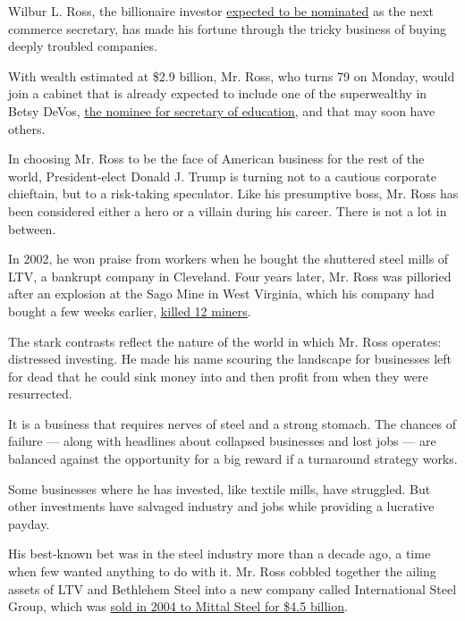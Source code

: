 Wilbur L. Ross, the billionaire investor
\href{http://www.nytimes3xbfgragh.onion/2016/11/24/us/politics/wilbur-ross-commerce-trump.html}{expected
to be nominated} as the next commerce secretary, has made his fortune
through the tricky business of buying deeply troubled companies.

With wealth estimated at \$2.9 billion, Mr. Ross, who turns 79 on
Monday, would join a cabinet that is already expected to include one of
the superwealthy in Betsy DeVos,
\href{http://www.nytimes3xbfgragh.onion/2016/11/23/us/politics/betsy-devos-trumps-education-pick-has-steered-money-from-public-schools.html}{the
nominee for secretary of education}, and that may soon have others.

In choosing Mr. Ross to be the face of American business for the rest of
the world, President-elect Donald J. Trump is turning not to a cautious
corporate chieftain, but to a risk-taking speculator. Like his
presumptive boss, Mr. Ross has been considered either a hero or a
villain during his career. There is not a lot in between.

In 2002, he won praise from workers when he bought the shuttered steel
mills of LTV, a bankrupt company in Cleveland. Four years later, Mr.
Ross was pilloried after an explosion at the Sago Mine in West Virginia,
which his company had bought a few weeks earlier,
\href{http://www.nytimes3xbfgragh.onion/2006/05/03/us/03mine.html}{killed
12 miners}.

The stark contrasts reflect the nature of the world in which Mr. Ross
operates: distressed investing. He made his name scouring the landscape
for businesses left for dead that he could sink money into and then
profit from when they were resurrected.

It is a business that requires nerves of steel and a strong stomach. The
chances of failure --- along with headlines about collapsed businesses
and lost jobs --- are balanced against the opportunity for a big reward
if a turnaround strategy works.

Some businesses where he has invested, like textile mills, have
struggled. But other investments have salvaged industry and jobs while
providing a lucrative payday.

His best-known bet was in the steel industry more than a decade ago, a
time when few wanted anything to do with it. Mr. Ross cobbled together
the ailing assets of LTV and Bethlehem Steel into a new company called
International Steel Group, which was
\href{http://www.nytimes3xbfgragh.onion/2004/10/26/business/worldbusiness/mergers-show-steel-industry-is-still-worthy-of-big.html}{sold
in 2004 to Mittal Steel for \$4.5 billion}.


